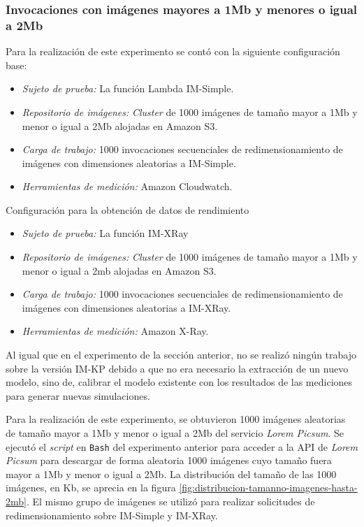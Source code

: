
\subsubsection{Invocaciones con imágenes mayores a 1Mb y menores o igual a 2Mb}
Para la realización de este experimento se contó con la siguiente configuración base:
\begin{itemize}
    \item \emph{Sujeto de prueba:} La función Lambda IM-Simple.
    \item \emph{Repositorio de imágenes:} \emph{Cluster} de 1000 imágenes de tamaño mayor a 1Mb y menor o igual a 2Mb alojadas en Amazon S3.     
    \item \emph{Carga de trabajo:} 1000 invocaciones secuenciales de redimensionamiento de imágenes con dimensiones aleatorias a IM-Simple.
    \item \emph{Herramientas de medición:} Amazon Cloudwatch.
\end{itemize}

Configuración para la obtención de datos de rendimiento

\begin{itemize}
    \item \emph{Sujeto de prueba:} La función IM-XRay
    \item \emph{Repositorio de imágenes:} \emph{Cluster} de 1000 imágenes de tamaño mayor a 1Mb y menor o igual a 2mb alojadas en Amazon S3.     
    \item \emph{Carga de trabajo:} 1000 invocaciones secuenciales de redimensionamiento de imágenes con dimensiones aleatorias a IM-XRay.
    \item \emph{Herramientas de medición:} Amazon X-Ray.
\end{itemize}

Al igual que en el experimento de la sección anterior, no se realizó ningún trabajo sobre la versión IM-KP debido a que no era necesario la extracción de un nuevo modelo, sino de, calibrar el modelo existente con los resultados de las mediciones para generar nuevas simulaciones.

Para la realización de este experimento, se obtuvieron 1000 imágenes aleatorias de tamaño mayor a 1Mb y menor o igual a 2Mb del servicio \emph{Lorem Picsum}. Se ejecutó el \emph{script} en \texttt{Bash} del experimento anterior para acceder a la API de \emph{Lorem Picsum} para descargar de forma aleatoria 1000 imágenes cuyo tamaño fuera mayor a 1Mb y menor o igual a 2Mb. La distribución del tamaño de las 1000 imágenes, en Kb, se aprecia en la figura \ref{fig:distribucion-tamanno-imagenes-hasta-2mb}. El mismo grupo de imágenes se utilizó para realizar solicitudes de redimensionamiento sobre IM-Simple y IM-XRay.

